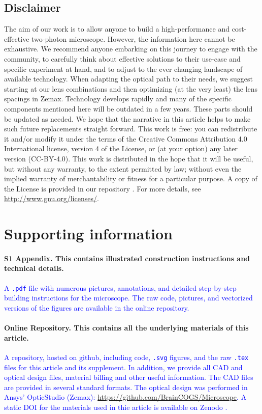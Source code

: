 \documentclass[10pt,letterpaper]{article}
\begin{document}
\subsection*{Disclaimer}
The aim of our work is to allow anyone to build a high-performance and cost-effective two-photon microscope. However, the information here cannot be exhaustive. We recommend anyone embarking on this journey to engage with the community, to carefully think about effective solutions to their use-case and specific experiment at hand, and to adjust to the ever changing landscape of available technology. When adapting the optical path to their needs, we suggest starting at our lens combinations and then optimizing (at the very least) the lens spacings in Zemax. Technology develops rapidly and many of the specific components mentioned here will be outdated in a few years. These parts should be updated as needed. We hope that the narrative in this article helps to make such future replacements straight forward.\newline
This work is free: you can redistribute it and/or modify it under the terms of the Creative Commons Attribution 4.0 International license, version 4 of the License, or (at your option) any later version (CC-BY-4.0). This work is distributed in the hope that it will be useful, but without any warranty, to the extent permitted by law; without even the implied warranty of merchantability or fitness for a particular purpose. A copy of the License is provided in our repository \cite{Zenodo2024}. For more details, see \url{http://www.gnu.org/licenses/}.

\section*{Supporting information}

\paragraph*{S1 Appendix. This contains illustrated construction instructions and technical details.}
\label{S1_Appendix}
\textcolor{blue}{A \texttt{.pdf} file with numerous pictures, annotations, and detailed step-by-step building instructions for the microscope. The raw code, pictures, and vectorized versions of the figures are available in the online repository.}

\paragraph*{Online Repository. This contains all the underlying materials of this article.}
\label{repository}
\textcolor{blue}{A repository, hosted on github, including code, \texttt{.svg} figures, and the raw \texttt{.tex} files for this article and its supplement. In addition, we provide all CAD and optical design files, material billing and other useful information. The CAD files are provided in several standard formats. The optical design was performed in Ansys' OpticStudio (Zemax): \url{https://github.com/BrainCOGS/Microscope}. A static DOI for the materials used in thie article is available on Zenodo \cite{Zenodo2024}.}
\end{document}
